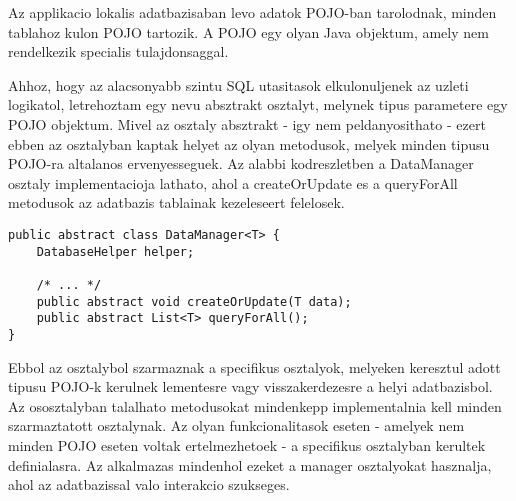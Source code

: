 Az applikacio lokalis adatbazisaban levo adatok POJO-ban tarolodnak, minden tablahoz kulon POJO tartozik.
A POJO egy olyan Java objektum, amely nem rendelkezik specialis tulajdonsaggal.

Ahhoz, hogy az alacsonyabb szintu SQL utasitasok elkulonuljenek az uzleti logikatol, letrehoztam egy  nevu absztrakt osztalyt, melynek tipus parametere egy POJO objektum. 
Mivel az osztaly absztrakt - igy nem peldanyosithato - ezert ebben az osztalyban kaptak helyet az olyan metodusok, melyek minden tipusu POJO-ra altalanos ervenyesseguek. 
Az alabbi kodreszletben a DataManager osztaly implementacioja lathato, ahol a createOrUpdate es a queryForAll metodusok az adatbazis tablainak kezeleseert felelosek.
\begin{lstlisting}
public abstract class DataManager<T> {	
    DatabaseHelper helper;
	
	/* ... */
    public abstract void createOrUpdate(T data);
    public abstract List<T> queryForAll();
}
\end{lstlisting} 
Ebbol az osztalybol szarmaznak a specifikus osztalyok, melyeken keresztul adott tipusu POJO-k kerulnek lementesre vagy visszakerdezesre a helyi adatbazisbol.
Az ososztalyban talalhato metodusokat mindenkepp implementalnia kell minden szarmaztatott osztalynak. 
Az olyan funkcionalitasok eseten - amelyek nem minden POJO eseten voltak ertelmezhetoek - a specifikus osztalyban kerultek definialasra.
Az alkalmazas mindenhol ezeket a manager osztalyokat hasznalja, ahol az adatbazissal valo interakcio szukseges.

